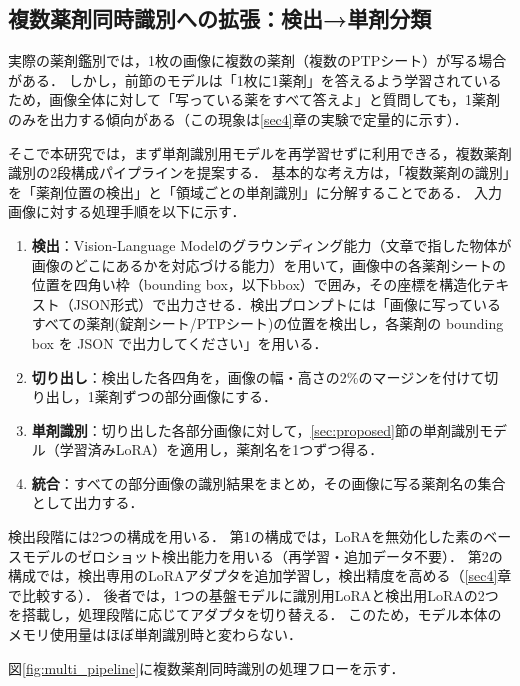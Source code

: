 \documentclass[dvipdfmx]{jsarticle}
\begin{document}
\subsection{複数薬剤同時識別への拡張：検出→単剤分類}\label{sec:multi}

実際の薬剤鑑別では，1枚の画像に複数の薬剤（複数のPTPシート）が写る場合がある．
しかし，前節のモデルは「1枚に1薬剤」を答えるよう学習されているため，画像全体に対して「写っている薬をすべて答えよ」と質問しても，1薬剤のみを出力する傾向がある（この現象は\ref{sec4}章の実験で定量的に示す）．

そこで本研究では，まず単剤識別用モデルを再学習せずに利用できる，複数薬剤識別の2段構成パイプラインを提案する．
基本的な考え方は，「複数薬剤の識別」を「薬剤位置の検出」と「領域ごとの単剤識別」に分解することである．
入力画像に対する処理手順を以下に示す．

\begin{enumerate}
  \item \textbf{検出}：Vision-Language Modelのグラウンディング能力（文章で指した物体が画像のどこにあるかを対応づける能力）を用いて，画像中の各薬剤シートの位置を四角い枠（bounding box，以下bbox）で囲み，その座標を構造化テキスト（JSON形式）で出力させる．検出プロンプトには「画像に写っているすべての薬剤(錠剤シート/PTPシート)の位置を検出し，各薬剤の bounding box を JSON で出力してください」を用いる．
  \item \textbf{切り出し}：検出した各四角を，画像の幅・高さの2\%のマージンを付けて切り出し，1薬剤ずつの部分画像にする．
  \item \textbf{単剤識別}：切り出した各部分画像に対して，\ref{sec:proposed}節の単剤識別モデル（学習済みLoRA）を適用し，薬剤名を1つずつ得る．
  \item \textbf{統合}：すべての部分画像の識別結果をまとめ，その画像に写る薬剤名の集合として出力する．
\end{enumerate}

検出段階には2つの構成を用いる．
第1の構成では，LoRAを無効化した素のベースモデルのゼロショット検出能力を用いる（再学習・追加データ不要）．
第2の構成では，検出専用のLoRAアダプタを追加学習し，検出精度を高める（\ref{sec4}章で比較する）．
後者では，1つの基盤モデルに識別用LoRAと検出用LoRAの2つを搭載し，処理段階に応じてアダプタを切り替える．
このため，モデル本体のメモリ使用量はほぼ単剤識別時と変わらない．

図\ref{fig:multi_pipeline}に複数薬剤同時識別の処理フローを示す．
\end{document}
